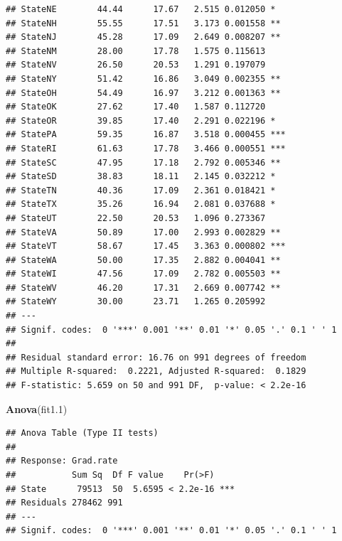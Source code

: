 \documentclass[]{article}
\newenvironment{Shaded}{\begin{snugshade}}{\end{snugshade}}
\newcommand{\KeywordTok}[1]{\textcolor[rgb]{0.13,0.29,0.53}{\textbf{#1}}}
\newcommand{\DecValTok}[1]{\textcolor[rgb]{0.00,0.00,0.81}{#1}}
\newcommand{\StringTok}[1]{\textcolor[rgb]{0.31,0.60,0.02}{#1}}
\newcommand{\CommentTok}[1]{\textcolor[rgb]{0.56,0.35,0.01}{\textit{#1}}}
\newcommand{\OperatorTok}[1]{\textcolor[rgb]{0.81,0.36,0.00}{\textbf{#1}}}
\newcommand{\NormalTok}[1]{#1}
\begin{document}
\begin{verbatim}
## StateNE        44.44      17.67   2.515 0.012050 *  
## StateNH        55.55      17.51   3.173 0.001558 ** 
## StateNJ        45.28      17.09   2.649 0.008207 ** 
## StateNM        28.00      17.78   1.575 0.115613    
## StateNV        26.50      20.53   1.291 0.197079    
## StateNY        51.42      16.86   3.049 0.002355 ** 
## StateOH        54.49      16.97   3.212 0.001363 ** 
## StateOK        27.62      17.40   1.587 0.112720    
## StateOR        39.85      17.40   2.291 0.022196 *  
## StatePA        59.35      16.87   3.518 0.000455 ***
## StateRI        61.63      17.78   3.466 0.000551 ***
## StateSC        47.95      17.18   2.792 0.005346 ** 
## StateSD        38.83      18.11   2.145 0.032212 *  
## StateTN        40.36      17.09   2.361 0.018421 *  
## StateTX        35.26      16.94   2.081 0.037688 *  
## StateUT        22.50      20.53   1.096 0.273367    
## StateVA        50.89      17.00   2.993 0.002829 ** 
## StateVT        58.67      17.45   3.363 0.000802 ***
## StateWA        50.00      17.35   2.882 0.004041 ** 
## StateWI        47.56      17.09   2.782 0.005503 ** 
## StateWV        46.20      17.31   2.669 0.007742 ** 
## StateWY        30.00      23.71   1.265 0.205992    
## ---
## Signif. codes:  0 '***' 0.001 '**' 0.01 '*' 0.05 '.' 0.1 ' ' 1
## 
## Residual standard error: 16.76 on 991 degrees of freedom
## Multiple R-squared:  0.2221, Adjusted R-squared:  0.1829 
## F-statistic: 5.659 on 50 and 991 DF,  p-value: < 2.2e-16
\end{verbatim}

\begin{Shaded}
\begin{Highlighting}[]
\KeywordTok{Anova}\NormalTok{(fit1.}\DecValTok{1}\NormalTok{)}
\end{Highlighting}
\end{Shaded}

\begin{verbatim}
## Anova Table (Type II tests)
## 
## Response: Grad.rate
##           Sum Sq  Df F value    Pr(>F)    
## State      79513  50  5.6595 < 2.2e-16 ***
## Residuals 278462 991                      
## ---
## Signif. codes:  0 '***' 0.001 '**' 0.01 '*' 0.05 '.' 0.1 ' ' 1
\end{verbatim}

\begin{Shaded}
\end{Shaded}
\end{document}
